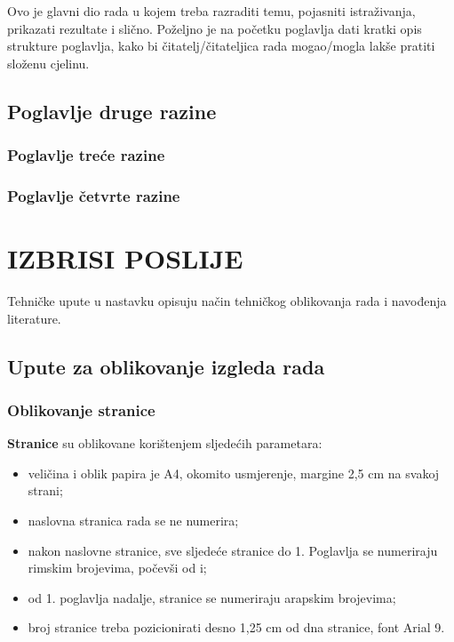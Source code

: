 \documentclass[]{foi}
\begin{document}
Ovo je glavni dio rada u kojem treba razraditi temu, pojasniti istraživanja, prikazati rezultate i slično. Poželjno je na početku poglavlja dati kratki opis strukture poglavlja, kako bi čitatelj/čitateljica rada mogao/mogla lakše pratiti složenu cjelinu.



\section{Poglavlje druge razine }

\lipsum[6]



\subsection{Poglavlje treće razine}

\lipsum[2]



\subsection{Poglavlje četvrte razine}

\lipsum[4-5]



\chapter{IZBRISI POSLIJE}

Tehničke upute u nastavku opisuju način tehničkog oblikovanja rada i navođenja literature.



\section{Upute za oblikovanje izgleda rada}

\subsection{Oblikovanje stranice}

\textbf{Stranice} su oblikovane korištenjem sljedećih parametara:

\begin{itemize}
    \item veličina i oblik papira je A4, okomito usmjerenje, margine 2,5 cm na svakoj strani;

    \item naslovna stranica rada se ne numerira;

    \item nakon naslovne stranice, sve sljedeće stranice do 1. Poglavlja se numeriraju rimskim brojevima, počevši od i;

    \item od 1. poglavlja nadalje, stranice se numeriraju arapskim brojevima;

    \item broj stranice treba pozicionirati desno 1,25 cm od dna stranice, font Arial 9.
\end{itemize}
\end{document}
